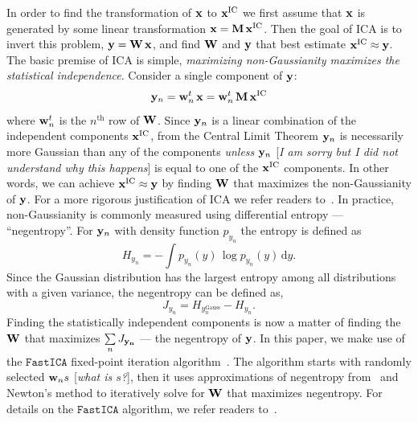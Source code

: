 \documentclass[12pt, letterpaper, preprint]{aastex}
\newcommand{\beq}{\begin{equation}}
\newcommand{\eeq}{\end{equation}}
\newcommand{\ms}[1]{{\color{orange}{\bf MS:}} {[\em #1}]}
\newcommand{\ica}{{\small{ICA}}\xspace}
\begin{document}
In order to find the transformation of ${\bf x}$ to ${\bf x}^\mathrm{IC}$ 
we first assume that ${\bf x}$ is generated by some linear transformation
${\bf x} = {\bf M}\,{\bf x}^\mathrm{IC}$. Then the goal of \ica is to invert 
this problem, ${\bf y} = {\bf W}\,{\bf x}$, and find ${\bf W}$ and ${\bf y}$ 
that best estimate ${\bf x}^\mathrm{IC} \approx {\bf y}$. The basic 
premise of ICA is simple, \emph{maximizing non-Gaussianity maximizes the 
statistical independence}. Consider a single component of ${\bf y}$: 
\beq
{\bf y}_n = {\bf w}_n^{\tiny t}\,{\bf x} = {\bf w}_n^{\tiny t}\,{\bf M}\,{\bf x}^\mathrm{IC} 
\eeq
where ${\bf w}_n^{\tiny t}$ is the $n^\mathrm{th}$ row of ${\bf W}$. 
Since ${\bf y}_n$ is a linear combination of the independent 
components ${\bf x}^\mathrm{IC}$, from the Central Limit Theorem 
${\bf y}_n$ is necessarily more Gaussian than any of the 
components \emph{unless} ${\bf y}_n$ \ms{I am sorry but I did not
understand why this happens} is equal to one of the 
${\bf x}^\mathrm{IC}$ components. In other words, we can achieve 
${\bf x}^\mathrm{IC} \approx {\bf y}$ by finding ${\bf W}$ that 
maximizes the non-Gaussianity of ${\bf y}$. For a more rigorous 
justification of ICA we refer readers to~\cite{hyvarinen2001independent}. 
In practice, non-Gaussianity is commonly measured using differential
entropy --- ``negentropy''. For ${\bf y}_n$ with density function 
$p_{y_n}$ the entropy is defined as
\beq
H_{y_n} =  - \int p_{y_n} (y)\, \log p_{y_n}(y)\, \mathrm{d}y. 
\eeq
Since the Gaussian distribution has the largest entropy among all 
distributions with a given variance, the negentropy can be defined 
as, 
\beq
J_{y_n} = H_{y_n^\mathrm{Gauss}} - H_{y_n}. 
\eeq
Finding the statistically independent components is now a matter
of finding the ${\bf W}$ that maximizes $\sum\limits_{n} J_{\bf y_n}$
--- the negentropy of ${\bf y}$. In this paper, we make use of the 
$\mathtt{FastICA}$ fixed-point iteration algorithm~\citep{hyvarinen1999}. 
The algorithm starts with randomly selected ${\bf w}_ns$\ms{what is $s$?}, then it uses 
approximations of negentropy from~\cite{hyvarinen1998} and Newton's method 
to iteratively solve for ${\bf W}$ that maximizes negentropy. For details 
on the $\mathtt{FastICA}$ algorithm, we refer readers to~\cite{hyvarinen1999}.
\end{document}

